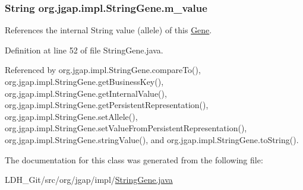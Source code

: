 \hypertarget{classorg_1_1jgap_1_1impl_1_1_string_gene_af4f6cadf2222aa3cf573e56b4d005ad2}{
\subsubsection[{m\-\_\-value}]{\setlength{\rightskip}{0pt plus 5cm}String org.\-jgap.\-impl.\-String\-Gene.\-m\-\_\-value\hspace{0.3cm}{\ttfamily [private]}}}\label{classorg_1_1jgap_1_1impl_1_1_string_gene_af4f6cadf2222aa3cf573e56b4d005ad2}
References the internal String value (allele) of this \hyperlink{interfaceorg_1_1jgap_1_1_gene}{Gene}. 

Definition at line 52 of file String\-Gene.\-java.



Referenced by org.\-jgap.\-impl.\-String\-Gene.\-compare\-To(), org.\-jgap.\-impl.\-String\-Gene.\-get\-Business\-Key(), org.\-jgap.\-impl.\-String\-Gene.\-get\-Internal\-Value(), org.\-jgap.\-impl.\-String\-Gene.\-get\-Persistent\-Representation(), org.\-jgap.\-impl.\-String\-Gene.\-set\-Allele(), org.\-jgap.\-impl.\-String\-Gene.\-set\-Value\-From\-Persistent\-Representation(), org.\-jgap.\-impl.\-String\-Gene.\-string\-Value(), and org.\-jgap.\-impl.\-String\-Gene.\-to\-String().



The documentation for this class was generated from the following file\-:\begin{DoxyCompactItemize}
\item 
L\-D\-H\-\_\-\-Git/src/org/jgap/impl/\hyperlink{_string_gene_8java}{String\-Gene.\-java}\end{DoxyCompactItemize}
